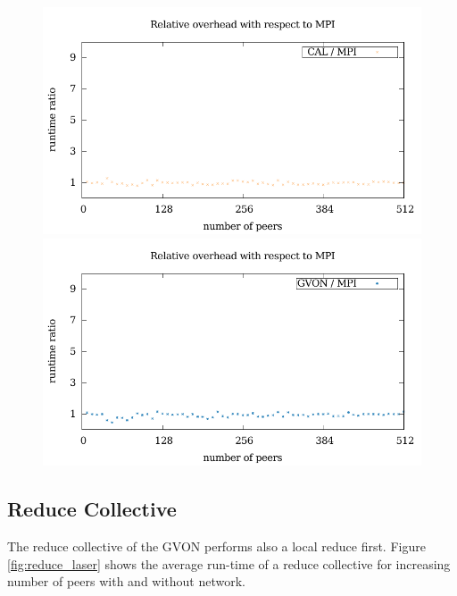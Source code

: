 \begin{figure}[H]
\begin{minipage}[t]{0.5\textwidth}
  \end{minipage}%
  \begin{minipage}[t]{0.5\textwidth}
    \includegraphics[width=\textwidth]{plots/50_collective_network_overhead_cal_laser}
    \includegraphics[width=\textwidth]{plots/50_collective_network_overhead_gvon_laser}
  \end{minipage}%
  \caption{ }
  \label{fig:gather_laser}
\end{figure}

\subsection*{Reduce Collective}
The reduce collective of the GVON performs also a local reduce first.
Figure \ref{fig:reduce_laser} shows the average run-time of a reduce
collective for increasing number of peers with and without network.

